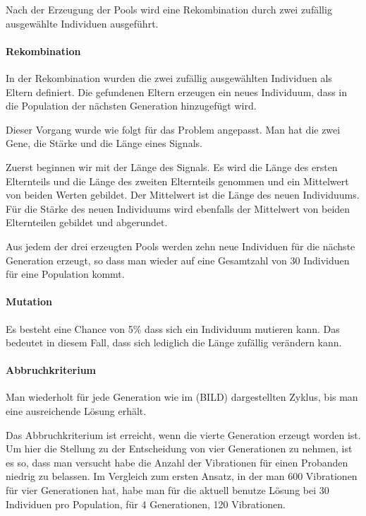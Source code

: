 Nach der Erzeugung der Pools wird eine Rekombination durch zwei zuf{\"a}llig ausgew{\"a}hlte Individuen ausgef{\"u}hrt.


\paragraph{Rekombination}
In der Rekombination wurden die zwei zuf{\"a}llig ausgew{\"a}hlten Individuen als Eltern definiert. Die gefundenen Eltern erzeugen ein neues Individuum, dass in die Population der n{\"a}chsten Generation hinzugef{\"u}gt wird. 

Dieser Vorgang wurde wie folgt f{\"u}r das Problem angepasst. Man hat die zwei Gene, die St{\"a}rke und die L{\"a}nge eines Signals.

Zuerst beginnen wir mit der L{\"a}nge des Signals. Es wird die L{\"a}nge des ersten Elternteils und die L{\"a}nge des zweiten Elternteils genommen und ein Mittelwert von beiden Werten gebildet. Der Mittelwert ist die L{\"a}nge des neuen Individuums.
F{\"u}r die St{\"a}rke des neuen Individuums wird ebenfalls der Mittelwert von beiden Elternteilen gebildet und abgerundet.

Aus jedem der drei erzeugten Pools werden zehn neue Individuen f{\"u}r die n{\"a}chste Generation erzeugt, so dass man wieder auf eine Gesamtzahl von 30 Individuen f{\"u}r eine Population kommt.


\paragraph{Mutation}
Es besteht eine Chance von 5\% dass sich ein Individuum mutieren kann. Das bedeutet in diesem Fall, dass sich lediglich die L{\"a}nge zuf{\"a}llig ver{\"a}ndern kann. 

\paragraph{Abbruchkriterium}
Man wiederholt f{\"u}r jede Generation wie im (BILD) dargestellten Zyklus, bis man eine ausreichende L{\"o}sung erh{\"a}lt.

Das Abbruchkriterium ist erreicht, wenn die vierte Generation erzeugt worden ist. Um hier die Stellung zu der Entscheidung von vier Generationen zu nehmen, ist es so, dass man versucht habe die Anzahl der Vibrationen f{\"u}r einen Probanden niedrig zu belassen. Im Vergleich zum ersten Ansatz, in der man 600 Vibrationen f{\"u}r vier Generationen hat, habe man f{\"u}r die aktuell benutze L{\"o}sung bei 30 Individuen pro Population, f{\"u}r 4 Generationen, 120 Vibrationen. 

